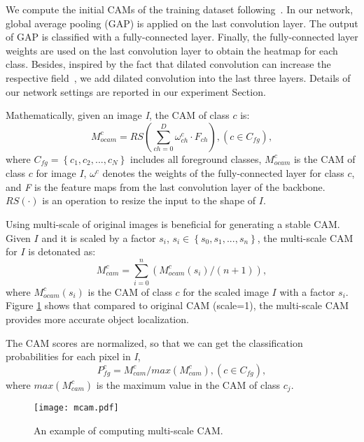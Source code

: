 \documentclass[letterpaper]{article} \usepackage{aaai20}  \usepackage{times}  \usepackage{helvet} \usepackage{courier}  \usepackage[hyphens]{url}  \usepackage{graphicx} \urlstyle{rm} \def\UrlFont{\rm}  \usepackage{graphicx}  \frenchspacing  \setlength{\pdfpagewidth}{8.5in}  \setlength{\pdfpageheight}{11in}
\begin{document}
We compute the initial CAMs of the training dataset following~\cite{zhou2016learning}. In our network, global average pooling (GAP) is applied on the last convolution layer. The output of GAP is classified with a fully-connected layer. Finally, the fully-connected layer weights are used on the last convolution layer to obtain the heatmap for each class. Besides, inspired by the fact that dilated convolution can increase the respective field~\cite{wei2018revisiting}, we add dilated convolution into the last three layers. Details of our network settings are reported in our experiment Section.

Mathematically, given an image \emph{I}, the CAM of class $c$ is:
\begin{equation}
M_{ocam}^{c} = RS(\sum_{ch=0}^{D}\omega_{ch}^{c} \cdot F_{ch}), (c \in C_{fg}), \label{cam}
\end{equation}
where $C_{fg} = \left \{ c_1,c_2,...,c_N \right \}$ includes all foreground classes, $M_{ocam}^{c}$ is the CAM of class $c$ for image $I$,  $\omega^{c}$ denotes the weights of the fully-connected layer for class $c$, and \emph{F} is the feature maps from the last convolution layer of the backbone. $RS(\cdot)$ is an operation to resize the input to the shape of $I$. 

Using multi-scale of original images is beneficial for generating a stable CAM. Given $I$ and it is scaled by a factor $s_i$, $s_i \in \left \{ s_0,s_1,...,s_n \right \}$, the multi-scale CAM for $I$ is detonated as:
\begin{equation}
M_{cam}^{c} = \sum_{i=0}^{n} (M_{ocam}^{c}(s_i)/(n+1)),\label{eqcam2}
\end{equation}  
where $M_{ocam}^{c}(s_i)$ is the CAM of class $c$ for the scaled image $I$ with a factor $s_i$. Figure \ref{mcam} shows that compared to original CAM (scale=1), the multi-scale CAM provides more accurate object localization.

The CAM scores are normalized, so that we can get the classification probabilities for each pixel in \emph{I},
\begin{equation}
P_{fg}^{c} = M_{cam}^{c}/max(M_{cam}^{c}), (c \in C_{fg}),\label{eq2}
\end{equation}
where $max(M_{cam}^{c})$ is the maximum value in the CAM of class $c_j$. 

\begin{figure}[!htb]
	\centering
	\texttt{[image: mcam.pdf]}
	\caption{An example of computing multi-scale CAM.}
	\label{mcam}
\end{figure}
\end{document}
